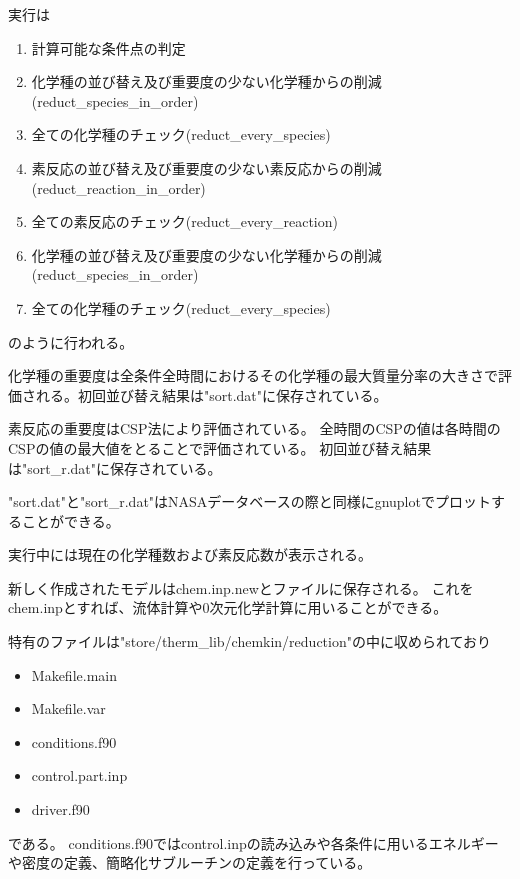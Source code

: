 \documentclass{jsarticle}
\begin{document}
実行は
\begin{enumerate}
\item 計算可能な条件点の判定
\item 化学種の並び替え及び重要度の少ない化学種からの削減(reduct\_species\_in\_order)
\item 全ての化学種のチェック(reduct\_every\_species)
\item 素反応の並び替え及び重要度の少ない素反応からの削減(reduct\_reaction\_in\_order)
\item 全ての素反応のチェック(reduct\_every\_reaction)
\item 化学種の並び替え及び重要度の少ない化学種からの削減(reduct\_species\_in\_order)
\item 全ての化学種のチェック(reduct\_every\_species)
\end{enumerate}
のように行われる。

化学種の重要度は全条件全時間におけるその化学種の最大質量分率の大きさで評価される。初回並び替え結果は"sort.dat"に保存されている。

素反応の重要度はCSP法により評価されている。
全時間のCSPの値は各時間のCSPの値の最大値をとることで評価されている。
初回並び替え結果は"sort\_r.dat"に保存されている。

"sort.dat"と"sort\_r.dat"はNASAデータベースの際と同様にgnuplotでプロットすることができる。

実行中には現在の化学種数および素反応数が表示される。

新しく作成されたモデルはchem.inp.newとファイルに保存される。
これをchem.inpとすれば、流体計算や0次元化学計算に用いることができる。

\hspace{1em}

特有のファイルは"store/therm\_lib/chemkin/reduction"の中に収められており
\begin{itemize}
\item Makefile.main
\item Makefile.var
\item conditions.f90
\item control.part.inp
\item driver.f90
\end{itemize}
である。
conditions.f90ではcontrol.inpの読み込みや各条件に用いるエネルギーや密度の定義、簡略化サブルーチンの定義を行っている。
\newpage

%


%
%
\end{document}
